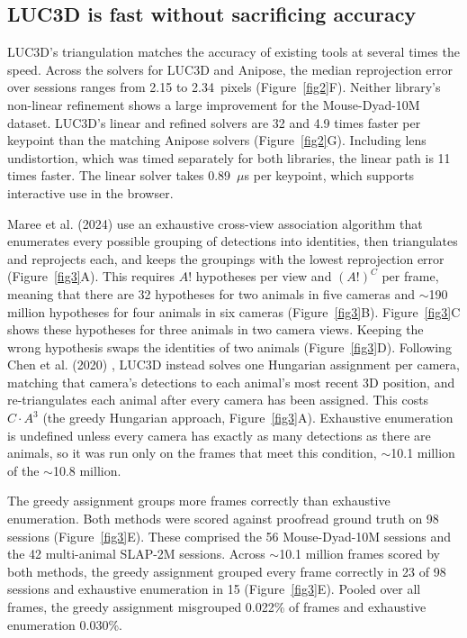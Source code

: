 \documentclass[pdflatex, sn-nature]{sn-jnl}
\theoremstyle{thmstyleone}%
\theoremstyle{thmstyletwo}%
\theoremstyle{thmstylethree}%
\begin{document}
\subsection{LUC3D is fast without sacrificing accuracy}\label{subsec2-3}

LUC3D's triangulation matches the accuracy of existing tools at several times the speed. Across the solvers for LUC3D and Anipose, the median reprojection error over sessions ranges from 2.15 to 2.34~pixels (Figure~\ref{fig2}F). Neither library's non-linear refinement shows a large improvement for the Mouse-Dyad-10M dataset. LUC3D's linear and refined solvers are 32 and 4.9 times faster per keypoint than the matching Anipose solvers (Figure~\ref{fig2}G). Including lens undistortion, which was timed separately for both libraries, the linear path is 11 times faster. The linear solver takes 0.89~$\mu$s per keypoint, which supports interactive use in the browser.

Maree et al. (2024) \citep{Maree2024} use an exhaustive cross-view association algorithm that enumerates every possible grouping of detections into identities, then triangulates and reprojects each, and keeps the groupings with the lowest reprojection error (Figure~\ref{fig3}A). This requires $A!$ hypotheses per view and $(A!)^C$ per frame, meaning that there are 32 hypotheses for two animals in five cameras and $\sim$190 million hypotheses for four animals in six cameras (Figure~\ref{fig3}B). Figure~\ref{fig3}C shows these hypotheses for three animals in two camera views. Keeping the wrong hypothesis swaps the identities of two animals (Figure~\ref{fig3}D). Following Chen et al. (2020) \citep{Chen2020}, LUC3D instead solves one Hungarian assignment per camera, matching that camera's detections to each animal's most recent 3D position, and re-triangulates each animal after every camera has been assigned. This costs $C \cdot A^3$ (the greedy Hungarian approach, Figure~\ref{fig3}A). Exhaustive enumeration is undefined unless every camera has exactly as many detections as there are animals, so it was run only on the frames that meet this condition, $\sim$10.1 million of the $\sim$10.8 million.

The greedy assignment groups more frames correctly than exhaustive enumeration. Both methods were scored against proofread ground truth on 98 sessions (Figure~\ref{fig3}E). These comprised the 56 Mouse-Dyad-10M sessions and the 42 multi-animal SLAP-2M sessions. Across $\sim$10.1 million frames scored by both methods, the greedy assignment grouped every frame correctly in 23 of 98 sessions and exhaustive enumeration in 15 (Figure~\ref{fig3}E). Pooled over all frames, the greedy assignment misgrouped 0.022\% of frames and exhaustive enumeration 0.030\%.
\end{document}
